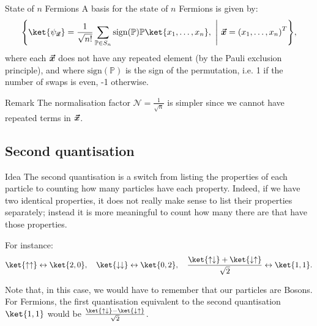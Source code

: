 \documentclass[a4paper]{article}
\begin{document}
\begin{parag}{State of $n$ Fermions}
    A basis for the state of $n$ Fermions is given by: 
    \[\left\{\ket{\psi_{\bvec{x}}} = \frac{1}{\sqrt{n!}} \sum_{\mathbb{P} \in S_n} \text{sign}\left(\mathbb{P}\right) \mathbb{P} \ket{x_1, \ldots, x_n}, \suchthat \bvec{x} = \left(x_1, \ldots, x_n\right)^T\right\},\]
    where each $\bm{\protect\vec{x}}$ does not have any repeated element (by the Pauli exclusion principle), and where $\text{sign}\left(\mathbb{P}\right)$ is the sign of the permutation, i.e. 1 if the number of swaps is even, -1 otherwise.

    \begin{subparag}{Remark}
        The normalisation factor $\mathcal{N} = \frac{1}{\sqrt{n}}$ is simpler since we cannot have repeated terms in $\bm{\protect\vec{x}}$.
    \end{subparag}
\end{parag}

\subsection{Second quantisation}

\begin{parag}{Idea}
    The second quantisation is a switch from listing the properties of each particle to counting how many particles have each property. Indeed, if we have two identical properties, it does not really make sense to list their properties separately; instead it is more meaningful to count how many there are that have those properties.

    For instance: 
    \[\ket{\uparrow \uparrow} \leftrightarrow \ket{2, 0}, \mathspace \ket{\downarrow \downarrow} \leftrightarrow \ket{0, 2}, \mathspace \frac{\ket{\uparrow \downarrow} + \ket{\downarrow \uparrow}}{\sqrt{2}} \leftrightarrow \ket{1, 1}.\]

    Note that, in this case, we would have to remember that our particles are Bosons. For Fermions, the first quantisation equivalent to the second quantisation $\ket{1, 1}$ would be $\frac{\ket{\uparrow \downarrow} - \ket{\downarrow \uparrow}}{\sqrt{2}}$.
\end{parag}
\end{document}

